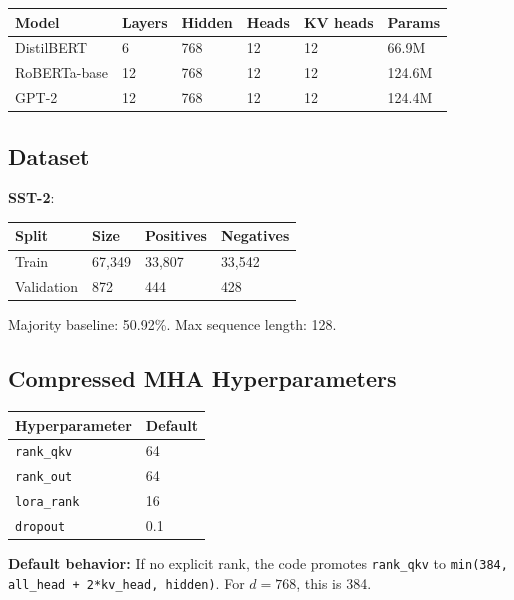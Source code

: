\begin{table}[H]
\centering
\small
\begin{tabular}{llllll}
\toprule
\textbf{Model} & \textbf{Layers} & \textbf{Hidden} & \textbf{Heads} & \textbf{KV heads} & \textbf{Params} \\
\midrule
DistilBERT & 6 & 768 & 12 & 12 & 66.9M \\
RoBERTa-base & 12 & 768 & 12 & 12 & 124.6M \\
GPT-2 & 12 & 768 & 12 & 12 & 124.4M \\
\bottomrule
\end{tabular}
\end{table}

\subsection{Dataset}

\textbf{SST-2}:

\begin{table}[H]
\centering
\small
\begin{tabular}{llll}
\toprule
\textbf{Split} & \textbf{Size} & \textbf{Positives} & \textbf{Negatives} \\
\midrule
Train & 67,349 & 33,807 & 33,542 \\
Validation & 872 & 444 & 428 \\
\bottomrule
\end{tabular}
\end{table}

Majority baseline: 50.92\%. Max sequence length: 128.

\subsection{Compressed MHA Hyperparameters}

\begin{table}[H]
\centering
\small
\begin{tabular}{ll}
\toprule
\textbf{Hyperparameter} & \textbf{Default} \\
\midrule
\texttt{rank\_qkv} & 64 \\
\texttt{rank\_out} & 64 \\
\texttt{lora\_rank} & 16 \\
\texttt{dropout} & 0.1 \\
\bottomrule
\end{tabular}
\end{table}

\textbf{Default behavior:} If no explicit rank, the code promotes \texttt{rank\_qkv} to 
\texttt{min(384, all\_head + 2*kv\_head, hidden)}. For $d = 768$, this is 384.


